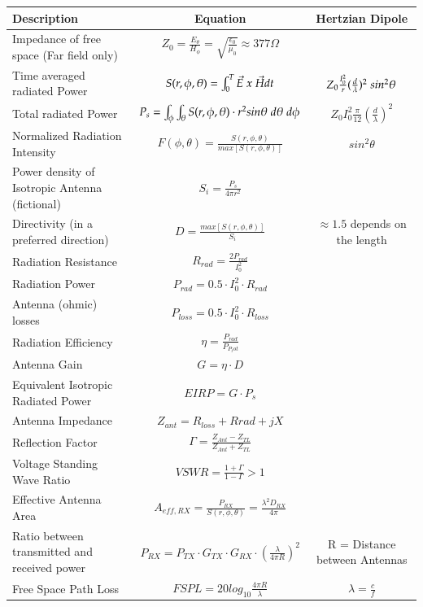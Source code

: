\begin{tabular}{|l|c|c|}
	\hline \textbf{Description} & \textbf{Equation} & \textbf{Hertzian Dipole}\\
	\hline Impedance of free space (Far field only) & $Z_0 =\frac{E_\theta}{H_\phi} = \sqrt{\frac{\epsilon_0}{\mu_0}} \approx 377 \Omega$ & \\
	\hline Time averaged radiated Power & $S(r,\phi,\theta)=\int_{0}^{T}\vec{E}\hspace{0.1cm} x\hspace{0.1cm} \vec{H}dt $ & $Z_0 \frac{I_0^2}{r}(\frac{d}{\lambda})^2 \hspace{0.1cm} sin^2 \theta$ \\
	\hline Total radiated Power & $ P_s=\int_{\phi}^{}\int_{\theta}^{}S(r,\phi,\theta)\cdot r^2 sin\theta \hspace{0.1cm} d\theta\hspace{0.1cm} d\phi$ & $Z_0 I_0^2 \frac{\pi}{12}(\frac{d}{\lambda})^2$   \\
	\hline Normalized Radiation Intensity & $ F(\phi,\theta)=\frac{S(r,\phi,\theta)}{max[S(r,\phi,\theta)]}$ & $sin^2 \theta$\\
	\hline Power density of Isotropic Antenna (fictional) & $ S_i = \frac{P_s}{4\pi r^2}$ & \\
	\hline Directivity (in a preferred direction) & $ D = \frac{max[S(r,\phi,\theta)]}{S_i}$ & $\approx 1.5 $ depends on the length\\
	\hline Radiation Resistance & $ R_{rad} = \frac{2P_{rad}}{I_0^2}$ & \\
	\hline Radiation Power & $ P_{rad} = 0.5 \cdot I_0^2 \cdot R_{rad} $ & \\ 
	\hline Antenna (ohmic) losses & $ P_{loss} = 0.5 \cdot I_0^2 \cdot R_{loss} $ & \\ 
	\hline Radiation Efficiency & $ \eta = \frac{P_{rad}}{P_{P_tot}}$ & \\
	\hline Antenna Gain & $G = \eta \cdot D $ & \\
	\hline Equivalent Isotropic Radiated Power & $EIRP = G \cdot P_s$ & \\
	\hline Antenna Impedance & $ Z_{ant} = R_{loss}+R{rad} +jX $ & \\
	\hline Reflection Factor & $\Gamma = \frac{Z_{Ant}- Z_{TL}}{Z_{Ant} + Z_{TL}}$ & \\
	\hline Voltage Standing Wave Ratio & $ VSWR = \frac{1+\Gamma}{1-\Gamma} > 1$ & \\
	\hline Effective Antenna Area & $ A_{eff,RX} = \frac{P_{RX}}{S(r,\phi,\theta)} = \frac{\lambda^2 D_{RX}}{4\pi} $ & \\
	\hline Ratio between transmitted and received power & $ P_{RX} = P_{TX}\cdot G_{TX}\cdot G_{RX}\cdot (\frac{\lambda}{4 \pi R})^2 $ & R = Distance between Antennas\\
	\hline Free Space Path Loss & $ FSPL = 20log_{10} \frac{4\pi R}{\lambda}$ & $\lambda = \frac{c}{f}$ \\
	\hline 
\end{tabular} 



